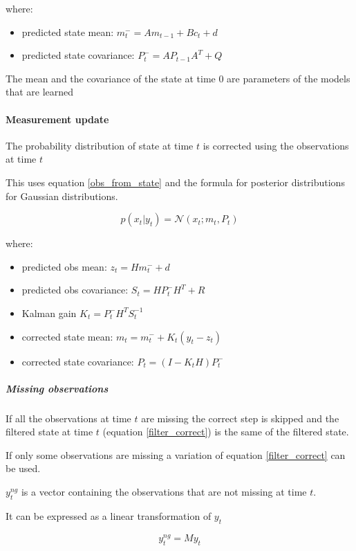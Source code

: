 \documentclass{article}
\begin{document}
where:
\begin{itemize}
    \item predicted state mean: $m_t^- = Am_{t-1} + B c_t + d$   
    \item predicted state covariance: $P_t^- = AP_{t-1}A^T + Q$
\end{itemize}

The mean and the covariance of the state at time $0$ are parameters of the models that are learned

\paragraph{Measurement update}

The probability distribution of state at time $t$ is corrected using the observations at time $t$

This uses equation \ref{obs_from_state} and the formula for posterior distributions for Gaussian distributions.

\begin{equation}\label{filter_correct}
 p(x_t|y_t) = \mathcal{N}(x_t; m_t, P_t)   
\end{equation}
    
where:

\begin{itemize}
    \item predicted obs mean: $z_t = Hm_t^- + d$   
    \item predicted obs covariance: $S_t = HP_t^-H^T + R$
    \item Kalman gain $K_t = P_t^-H^TS_t^{-1}$ 
    \item corrected state mean: $m_t = m_t^- + K_t(y_t - z_t)$ 
    \item corrected state covariance: $P_t = (I-K_tH)P_t^-$ 
\end{itemize}

\subparagraph{Missing observations}
If all the observations at time $t$ are missing the correct step is skipped and the filtered state at time $t$ (equation \ref{filter_correct}) is the same of the filtered state.

If only some observations are missing a variation of equation \ref{filter_correct} can be used.

$y^{ng}_t$ is a vector containing the observations that are not missing at time $t$. 

It can be expressed as a linear transformation of $y_t$

$$ y^{ng}_t = My_t$$
\end{document}
